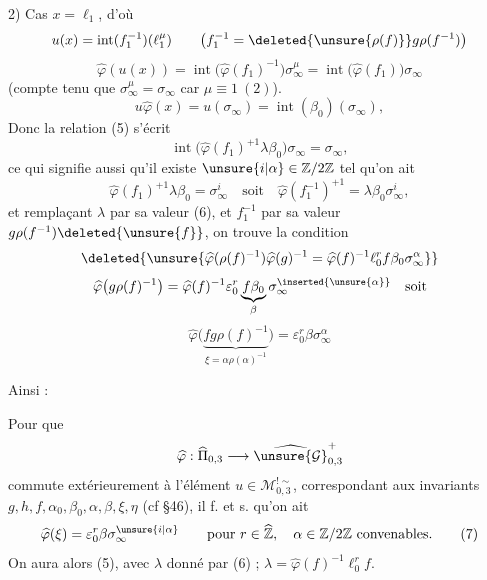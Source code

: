 2) Cas $x=\ell_1$, d'où
\[
u(x)=\operatorname{int}(f_1^{-1})(\ell_1^\mu)
\qquad\bigl(f_1^{-1}=\deleted{\unsure{\rho(f)}}g\rho(f^{-1})\bigr)
\]
\[
\widehat\varphi(u(x))=\operatorname{int}\bigl(\widehat\varphi(f_1)^{-1}\bigr)\sigma_\infty^\mu=\operatorname{int}\bigl(\widehat\varphi(f_1)\bigr)\sigma_\infty
\]
(compte tenu que $\sigma_\infty^\mu=\sigma_\infty$ car $\mu\equiv1\ (2)$).
\[
u\widehat\varphi(x)=u(\sigma_\infty)=\operatorname{int}(\beta_0)(\sigma_\infty),
\]
Donc la relation (5) s'écrit
\[
\operatorname{int}\bigl(\widehat\varphi(f_1)^{+1}\lambda\beta_0\bigr)\sigma_\infty=\sigma_\infty,
\]
ce qui signifie aussi qu'il existe $\unsure{i|\alpha}\in\mathbb Z/2\mathbb Z$ tel qu'on ait 
\[
\widehat\varphi(f_1)^{+1}\lambda\beta_0=\sigma_\infty^i
\quad\text{soit}\quad
\widehat\varphi(f_1^{-1})^{+1}=\lambda\beta_0\sigma_\infty^i,
\]
et remplaçant $\lambda$ par sa valeur (6), et $f_1^{-1}$ par sa valeur $g\rho(f^{-1})\deleted{\unsure{f}}$, on trouve la condition
\[
\deleted{\unsure{\widehat\varphi(\rho(f)^{-1})\widehat\varphi(g)^{-1}=\widehat\varphi(f)^{-1}\ell_0^r f\beta_0\sigma_\infty^\alpha}}
\]
\[
\widehat\varphi\bigl(g\rho(f)^{-1}\bigr)=\widehat\varphi(f)^{-1}\varepsilon_0^r\underbrace{f\beta_0}_{\beta}\sigma_\infty^{\inserted{\unsure{\alpha}}}\quad\text{soit}
\]
\[
\widehat\varphi\bigl(\underbrace{fg\rho(f)^{-1}}_{\xi=\alpha\rho(\alpha)^{-1}}\bigr)=\varepsilon_0^r\beta\sigma_\infty^\alpha
\]


Ainsi :

\uline{} Pour que
\[
\widehat\varphi:\widehat\Pi_{0,3}\longrightarrow
\widehat{\unsure{\mathcal G}}_{0,3}^{+}
\]
commute extérieurement à l'élément
$u\in\mathcal M_{0,3}^{!\sim}$, correspondant aux invariants
$g,h,f,\alpha_0,\beta_0,\alpha,\beta,\xi,\eta$ (cf \S 46),
il f. et s. qu'on ait
\[
\widehat\varphi(\xi)=\varepsilon_0^r\beta\sigma_\infty^{\unsure{i|\alpha}}
\qquad\text{pour }r\in\widehat{\mathbb Z},\quad
\alpha\in\mathbb Z/2\mathbb Z\ \text{convenables}.
\tag{7}
\]
On aura alors (5), avec 
$\lambda$ donné par (6) ;
$\lambda=\widehat\varphi(f)^{-1}\ell_0^r f$.

